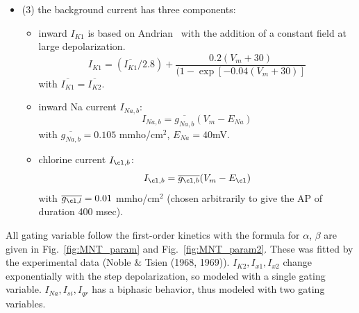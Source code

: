 \begin{itemize}
\item (3) the background current has three components:
  \begin{itemize}
  \item inward $I_{K1}$
    is based on Andrian~\citep{adrian1969rms} with the addition of a
    constant field at large depolarization.
    \begin{equation}
      \label{eq:614}
      I_{K1} = (\overline{I_{K1}}/2.8) + \frac{0.2(V_m + 30)}{(1- \exp[ - 0.04(V_m + 30)]}
    \end{equation}
    with $\overline{I_{K1}}=\overline{I_{K2}}$.

  \item inward Na current $I_{Na,b}$:
    \begin{equation}
      \label{eq:615}
      I_{Na,b} = \overline{g_{Na,b}}(V_m-E_{Na})
    \end{equation}
    with $\overline{g_{Na,b}}=0.105$ mmho/cm$^2$, $E_{Na}=40$mV.
  \item chlorine current $I_{\cl,b}$:
    \begin{equation}
      \label{eq:616}
      I_{\cl,b} = \overline{g_{\cl,b}} (V_m-E_{\cl})
    \end{equation}
with $\overline{g_{\cl,l}}=0.01$ mmho/cm$^2$ (chosen arbitrarily to give the
AP of duration 400 msec).

  \end{itemize}
\end{itemize}
All gating variable follow the first-order kinetics with the formula
for $\alpha$, $\beta$ are given in Fig.~\ref{fig:MNT_param} and
Fig.~\ref{fig:MNT_param2}. These was fitted by the experimental data
(Noble \& Tsien (1968, 1969)). $I_{K2},I_{x1},I_{x2}$ change
exponentially with the step depolarization, so modeled with a single
gating variable. $I_{Na}, I_{si}, I_{qr}$ has a biphasic behavior,
thus modeled with two gating variables.

